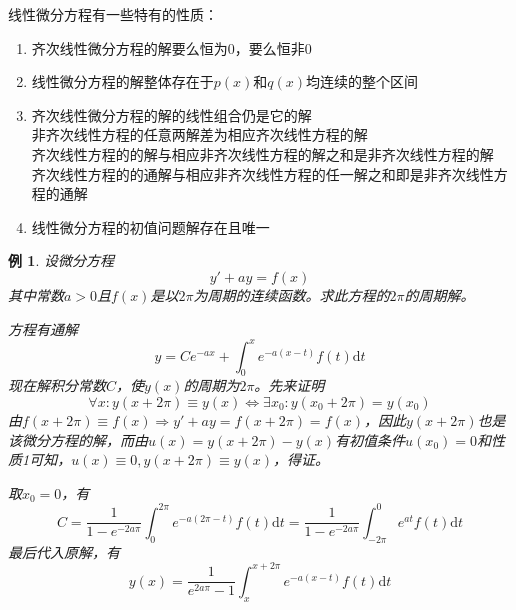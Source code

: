 \documentclass[UTF8]{book}
\renewcommand{\d}{\mathrm{d}}
\newcommand{\To}{\Longrightarrow}
\newtheorem{example}{例}
\begin{document}
    线性微分方程有一些特有的性质：\begin{enumerate}
        \item 齐次线性微分方程的解要么恒为0，要么恒非0
        \item 线性微分方程的解整体存在于$p(x)$和$q(x)$均连续的整个区间
        \item 齐次线性微分方程的解的线性组合仍是它的解\\ 非齐次线性方程的任意两解差为相应齐次线性方程的解\\ 齐次线性方程的的解与相应非齐次线性方程的解之和是非齐次线性方程的解\\ 齐次线性方程的的通解与相应非齐次线性方程的任一解之和即是非齐次线性方程的通解
        \item 线性微分方程的初值问题解存在且唯一
    \end{enumerate}
    \begin{example}
        设微分方程$$y'+ay=f(x)$$其中常数$a>0$且$f(x)$是以$2\pi$为周期的连续函数。求此方程的$2\pi$的周期解。
        
        方程有通解$$y=Ce^{-ax}+\int^x_0 e^{-a(x-t)}f(t)\d t$$现在解积分常数$C$，使$y(x)$的周期为$2\pi$。先来证明$$\forall x:y(x+2\pi)\equiv y(x)\iff \exists x_0:y(x_0+2\pi)=y(x_0)$$
        由$f(x+2\pi)\equiv f(x)\To y'+ay=f(x+2\pi)=f(x)$，因此$y(x+2\pi)$也是该微分方程的解，而由$u(x)=y(x+2\pi)-y(x)$有初值条件$u(x_0)=0$和性质1可知，$u(x)\equiv 0,y(x+2\pi)\equiv y(x)$，得证。

        取$x_0=0$，有$$C=\frac{1}{1-e^{-2a\pi}}\int^{2\pi}_0 e^{-a(2\pi -t)}f(t)\d t=\frac{1}{1-e^{-2a\pi}}\int_{-2\pi}^0 e^{at}f(t)\d t$$
        最后代入原解，有$$y(x)=\frac{1}{e^{2a\pi}-1}\int^{x+2\pi}_x e^{-a(x-t)}f(t)\d t$$
    \end{example}
\end{document}
